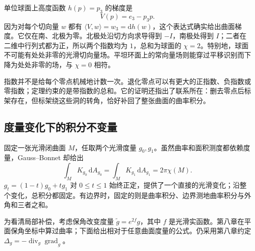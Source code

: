 \begin{example}
	\label{g1:exm:sphere-vector-indices}
	单位球面上高度函数 \(h(p)=p_3\) 的梯度是
	\[
		V(p)=e_3-p_3p.
	\]
	因为对每个切向量 \(w\) 都有 \(\langle V,w\rangle=w_3=\mathrm{d}h(w)\)，这个表达式确实给出曲面梯度。它仅在南、北极为零。北极处沿切方向求导得到 \(-I\)，南极处得到 \(I\)；二者在二维中行列式都为正，所以两个指数均为 \(1\)，总和为球面的 \(\chi=2\)。特别地，球面不可能有处处非零的光滑切向量场。平坦环面上的常向量场则能穿过平移识别而下降为处处非零的场，与 \(\chi=0\) 相符。
\end{example}

指数并不是给每个零点机械地计数一次。退化零点可以有更大的正指数、负指数或零指数；定理约束的是带指数的总和。它的证明还指出了联系所在：删去零点后标架存在，但标架绕这些洞的转角，恰好补回了整张曲面的曲率积分。

\subsection{度量变化下的积分不变量}
\label{g1:subsec:0905:03}

固定一张光滑闭曲面 \(M\)，任取两个光滑度量 \(g_0,g_1\)。虽然曲率和面积测度都依赖度量，Gauss--Bonnet 却给出
\[
	\int_MK_{g_0}\,\mathrm{d}A_{g_0}=\int_MK_{g_1}\,\mathrm{d}A_{g_1}=2\pi\chi(M).
\]
\(g_t=(1-t)g_0+tg_1\) 对 \(0\le t\le1\) 始终正定，提供了一个直接的光滑变化；沿整个变化，总积分都固定。有边界时，固定的则是曲率积分、边界测地曲率积分与外角和三者之和。

为看清局部补偿，考虑保角改变度量 \(\widetilde g=e^{2f}g\)，其中 \(f\) 是光滑实函数。第八章在平面保角坐标中算过曲率；下面给出相对于任意曲面度量的公式。仍采用第八章约定 \(\Delta_g=-\operatorname{div}_g\operatorname{grad}_g\)。

